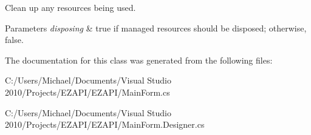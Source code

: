 Clean up any resources being used. 


\begin{DoxyParams}{Parameters}
{\em disposing} & true if managed resources should be disposed; otherwise, false.\\
\hline
\end{DoxyParams}


The documentation for this class was generated from the following files\-:\begin{DoxyCompactItemize}
\item 
C\-:/\-Users/\-Michael/\-Documents/\-Visual Studio 2010/\-Projects/\-E\-Z\-A\-P\-I/\-E\-Z\-A\-P\-I/Main\-Form.\-cs\item 
C\-:/\-Users/\-Michael/\-Documents/\-Visual Studio 2010/\-Projects/\-E\-Z\-A\-P\-I/\-E\-Z\-A\-P\-I/Main\-Form.\-Designer.\-cs\end{DoxyCompactItemize}

